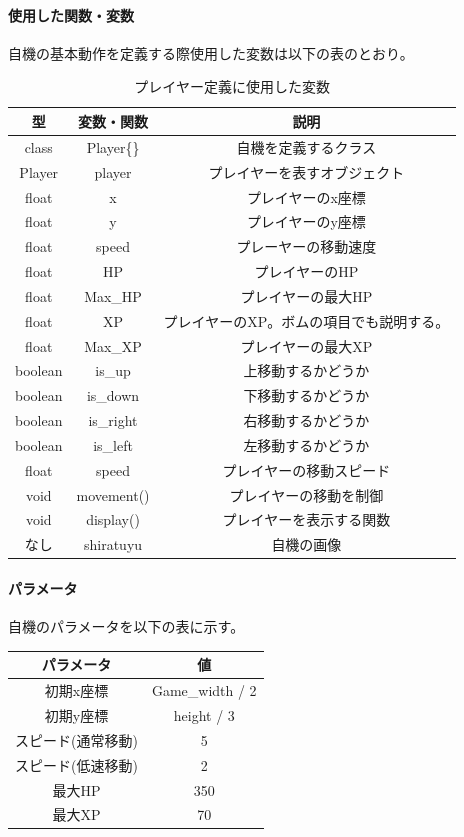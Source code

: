 \documentclass[a4paper,titlepage,11pt]{ltjsarticle}
\begin{document}
\paragraph{使用した関数・変数}
自機の基本動作を定義する際使用した変数は以下の表のとおり。
\begin{table}[H]
		\label{player_funk}
		\centering
		\caption{プレイヤー定義に使用した変数}
		\begin{tabular}{|c|c|c|}
			\hline
			型 & 変数・関数 & 説明\\ \hline \hline
			class & Player\{\} & 自機を定義するクラス \\ \hline		
			Player & player & プレイヤーを表すオブジェクト \\ \hline	
			float & x & プレイヤーのx座標 \\ \hline
			float & y & プレイヤーのy座標 \\ \hline
			float & speed & プレーヤーの移動速度 \\ \hline
			float & HP & プレイヤーのHP \\ \hline
			float & Max\_HP & プレイヤーの最大HP \\ \hline
			float & XP & プレイヤーのXP。ボムの項目でも説明する。 \\ \hline
			float & Max\_XP & プレイヤーの最大XP \\ \hline
			boolean & is\_up & 上移動するかどうか\\ \hline
			boolean & is\_down &  下移動するかどうか\\ \hline 
			boolean & is\_right & 右移動するかどうか \\ \hline
			boolean & is\_left & 左移動するかどうか \\ \hline
			float & speed & プレイヤーの移動スピード \\ \hline
			void & movement() & プレイヤーの移動を制御\\ \hline
			void & display() & プレイヤーを表示する関数 \\ \hline
			なし & shiratuyu & 自機の画像 \\ \hline
		\end{tabular}
\end{table}

\paragraph{パラメータ}
自機のパラメータを以下の表に示す。
\begin{table}[H]
	\centering
	\begin{tabular}{|c|c|}
		\hline
		パラメータ & 値 \\ \hline \hline
		初期x座標 & Game\_width / 2 \\ \hline
		初期y座標 & height / 3 \\ \hline
		スピード(通常移動) & 5\\ \hline
		スピード(低速移動) & 2 \\ \hline 
		最大HP & 350 \\ \hline
		最大XP & 70 \\ \hline
	\end{tabular}
\end{table}
\end{document}
